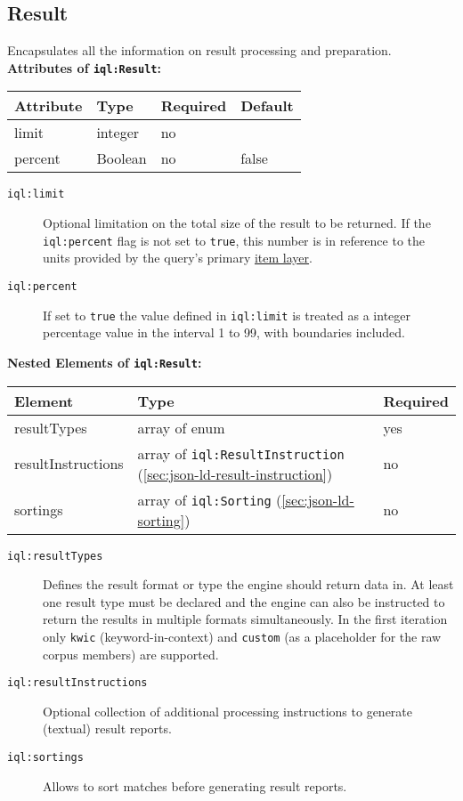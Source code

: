 \documentclass[11pt,a4paper,portrait]{article}
\newcommand{\iqlns}{iql:}
\newcommand{\repoUrl}{https://github.com/ICARUS-tooling/icarus2-modeling-framework/blob/dev/}
\newcommand{\modelsUrl}{\repoUrl icarus2-model-api/src/main/java/de/ims/icarus2/model/api/}
\newcommand{\repoLink}[2]{\href{#1}{#2}}
\newcommand{\iqlType}[1]{\texttt{\iqlns#1}}
\newcommand{\desc}[1]{\noindent#1\newline\medskip}
\newenvironment{attributes}[1]{
\noindent\textbf{Attributes of #1:}\newline\medskip
\begin{tabular}{|p{0.3\textwidth}|p{0.20\textwidth}|p{0.20\textwidth}|p{0.17\textwidth}|}
	\hline
	\textbf{Attribute} & \textbf{Type} & \textbf{Required} & \textbf{Default} \\ 
	\hline
	\hline
}{
\end{tabular}
}
\newcommand{\attribute}[4]{
	#1 & #2 & #3 & #4 \\
	\hline
}
\newenvironment{elements}[1]{
\noindent\textbf{Nested Elements of #1:}\newline\medskip
\begin{tabular}{|p{0.3\textwidth}|p{0.42\textwidth}|p{0.17\textwidth}|}
	\hline
	\textbf{Element} & \textbf{Type} & \textbf{Required} \\ 
	\hline
	\hline
}{
\end{tabular}
}
\newcommand{\element}[3]{
#1 & #2 & #3 \\
\hline
}
\begin{document}
\subsection{Result}
\label{sec:json-ld-result}
\desc{Encapsulates all the information on result processing and preparation.}
\begin{attributes}{\iqlType{Result}}
	\attribute{limit}{integer}{no}{}
	\attribute{percent}{Boolean}{no}{false}
\end{attributes}
\begin{description}
	\item[\iqlType{limit}] Optional limitation on the total size of the result to be returned. If the \iqlType{percent} flag is not set to \texttt{true}, this number is in reference to the units provided by the query's primary \repoLink{\modelsUrl layer/ItemLayer.java}{item layer}.
	\item[\iqlType{percent}] If set to \texttt{true} the value defined in \iqlType{limit} is treated as a integer percentage value in the interval 1 to 99, with boundaries included.
\end{description}
\begin{elements}{\iqlType{Result}}
	\element{resultTypes}{array of enum}{yes}
	\element{resultInstructions}{array of \iqlType{ResultInstruction} (\ref{sec:json-ld-result-instruction})}{no}
	\element{sortings}{array of \iqlType{Sorting} (\ref{sec:json-ld-sorting})}{no}
\end{elements}
\begin{description}
	\item[\iqlType{resultTypes}] Defines the result format or type the engine should return data in. At least one result type must be declared and the engine can also be instructed to return the results in multiple formats simultaneously. In the first iteration only \texttt{kwic} (keyword-in-context) and \texttt{custom} (as a placeholder for the raw corpus members) are supported.
	\item[\iqlType{resultInstructions}] Optional collection of additional processing instructions to generate (textual) result reports.
	\item[\iqlType{sortings}] Allows to sort matches before generating result reports.
\end{description}
\end{document}
